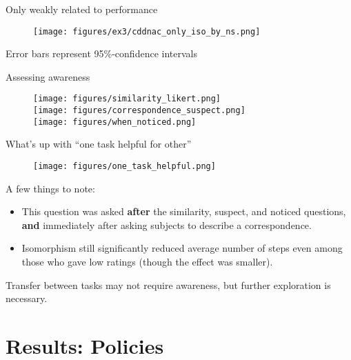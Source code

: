 \documentclass{beamer}
\begin{document}
\begin{frame}{Only weakly related to performance}
\begin{figure}
\centering
    \texttt{[image: figures/ex3/cddnac\_only\_iso\_by\_ns.png]}
\end{figure}
{\scriptsize Error bars represent 95\%-confidence intervals}
\end{frame}


\begin{frame}{Assessing awareness}
\begin{figure}
\centering
\texttt{[image: figures/similarity\_likert.png]}\\
\texttt{[image: figures/correspondence\_suspect.png]}\\
\texttt{[image: figures/when\_noticed.png]}
\end{figure}
\end{frame}



\begin{frame}{What's up with ``one task helpful for other''}
\begin{figure}
\centering
\texttt{[image: figures/one\_task\_helpful.png]}
\end{figure}
A few things to note:
\begin{itemize}
\item<2-> This question was asked \textbf{after} the similarity, suspect, and noticed questions, \textbf{and} immediately after asking subjects to describe a correspondence.
\item<3-> Isomorphism still significantly reduced average number of steps even among those who gave low ratings (though the effect was smaller).
\end{itemize}
\end{frame}

\begin{frame}[standout]
Transfer between tasks may not require awareness, but further exploration is necessary.
\end{frame}

\section{Results: Policies}
\end{document}
